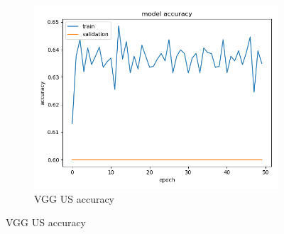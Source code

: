 \begin{figure}[h!]
\begin{subfigure}[b]{.3\linewidth}
\includegraphics[width=\linewidth]{Figs/vgg_us_acc.jpg}
\caption{VGG US accuracy}
\end{subfigure}


\end{figure}
